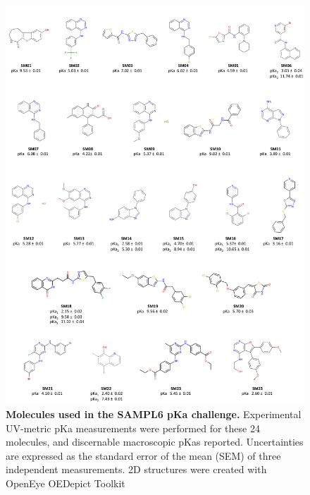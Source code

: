 \documentclass[9pt,lineno]{elife}
\begin{document}
\begin{figure}
\includegraphics[width=1.00\linewidth]{figures/SAMPL6_pKa_molecules_fig}
\caption{{\bf Molecules used in the SAMPL6 pKa challenge.} 
Experimental UV-metric pKa measurements were performed for these 24 molecules, and discernable macroscopic pKas reported. 
Uncertainties are expressed as the standard error of the mean (SEM) of three independent measurements. 
2D structures were created with OpenEye OEDepict Toolkit~\citep{oedepict_openeye_2017}
}
\label{fig:pKa_molecules}
\end{figure}
\end{document}
